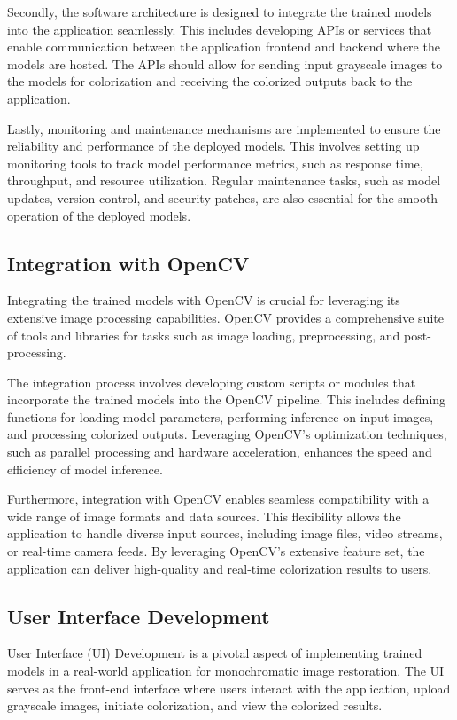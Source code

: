 Secondly, the software architecture is designed to integrate the trained models into the application seamlessly. This includes developing APIs or services that enable communication between the application frontend and backend where the models are hosted. The APIs should allow for sending input grayscale images to the models for colorization and receiving the colorized outputs back to the application.

Lastly, monitoring and maintenance mechanisms are implemented to ensure the reliability and performance of the deployed models. This involves setting up monitoring tools to track model performance metrics, such as response time, throughput, and resource utilization. Regular maintenance tasks, such as model updates, version control, and security patches, are also essential for the smooth operation of the deployed models.


\subsection{Integration with OpenCV}

Integrating the trained models with OpenCV is crucial for leveraging its extensive image processing capabilities. OpenCV provides a comprehensive suite of tools and libraries for tasks such as image loading, preprocessing, and post-processing.

The integration process involves developing custom scripts or modules that incorporate the trained models into the OpenCV pipeline. This includes defining functions for loading model parameters, performing inference on input images, and processing colorized outputs. Leveraging OpenCV's optimization techniques, such as parallel processing and hardware acceleration, enhances the speed and efficiency of model inference.

Furthermore, integration with OpenCV enables seamless compatibility with a wide range of image formats and data sources. This flexibility allows the application to handle diverse input sources, including image files, video streams, or real-time camera feeds. By leveraging OpenCV's extensive feature set, the application can deliver high-quality and real-time colorization results to users.


\subsection{User Interface Development}

User Interface (UI) Development is a pivotal aspect of implementing trained models in a real-world application for monochromatic image restoration. The UI serves as the front-end interface where users interact with the application, upload grayscale images, initiate colorization, and view the colorized results.

